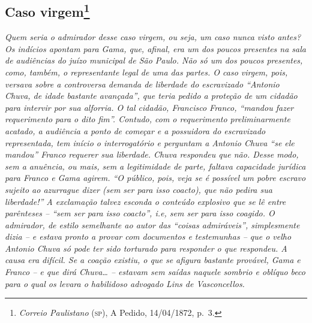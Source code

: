 {\begin{flushright}
\chapter{Caso virgem\footnote{\emph{Correio Paulistano} (\textsc{sp}), A Pedido, 14/04/1872,
  p.~3.}} %

\begin{didascalia}
\emph{Quem seria o admirador desse caso virgem, ou seja, um caso nunca
visto antes? Os indícios apontam para Gama, que, afinal, era um dos
poucos presentes na sala de audiências do juízo municipal de São Paulo.
Não só um dos poucos presentes, como, também, o representante legal de
uma das partes. O caso virgem, pois, versava sobre a controversa demanda
de liberdade do escravizado ``Antonio Chuva, de idade bastante avançada'',
que teria pedido a proteção de um cidadão para intervir por sua
alforria. O tal cidadão, Francisco Franco, ``mandou fazer requerimento
para o dito fim''. Contudo, com o requerimento preliminarmente acatado, a
audiência a ponto de começar e a possuidora do escravizado representada,
tem início o interrogatório e perguntam a Antonio Chuva ``se ele mandou''
Franco requerer sua liberdade. Chuva respondeu que não. Desse modo, sem
a anuência, ou mais, sem a legitimidade de parte, faltava capacidade
jurídica para Franco e Gama agirem. ``O público, pois, veja se é possível
um pobre escravo sujeito ao azurrague dizer (sem ser para isso coacto),
que não pedira sua liberdade!'' A exclamação talvez esconda o conteúdo
explosivo que se lê entre parênteses -- ``sem ser para isso coacto'', i.e,
sem ser para isso coagido. O admirador, de estilo semelhante ao autor
das ``coisas admiráveis'', simplesmente dizia -- e estava pronto a provar
com documentos e testemunhas -- que o velho Antonio Chuva só pode ter
sido torturado para responder o que respondeu. A causa era difícil. Se a
coação existiu, o que se afigura bastante provável, Gama e Franco -- e
que dirá Chuva\ldots{} -- estavam sem saídas naquele sombrio e oblíquo beco
para o qual os levara o habilidoso advogado Lins de Vasconcellos.}
\end{didascalia}


\end{flushright}}
